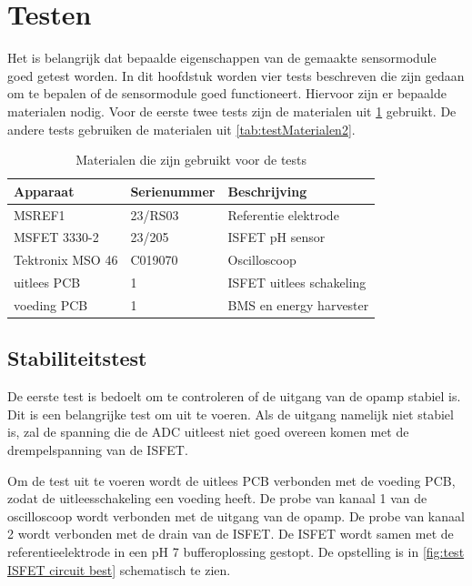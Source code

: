 \section{Testen}

Het is belangrijk dat bepaalde eigenschappen van de gemaakte sensormodule goed getest worden. In dit hoofdstuk worden vier tests beschreven die zijn gedaan om te bepalen of de sensormodule goed functioneert. Hiervoor zijn er bepaalde materialen nodig. Voor de eerste twee tests zijn de materialen uit \cref{tab:testMaterialen} gebruikt. De andere tests gebruiken de materialen uit \cref{tab:testMaterialen2}.

\begin{table}[!htbp]
    \centering
    \begin{tabular}{l|l|l}
        Apparaat         & Serienummer & Beschrijving \\
        \hline
        MSREF1           & 23/RS03     & Referentie elektrode       \\
        MSFET 3330-2     & 23/205      & ISFET pH sensor            \\
        Tektronix MSO 46 & C019070     & Oscilloscoop               \\
        uitlees PCB      & 1           & ISFET uitlees schakeling   \\
        voeding PCB      & 1           & BMS en energy harvester    \\
        \hline
    \end{tabular}
    \caption{Materialen die zijn gebruikt voor de tests}
    \label{tab:testMaterialen}
\end{table}

\subsection{Stabiliteitstest}
De eerste test is bedoelt om te controleren of de uitgang van de opamp stabiel is. Dit is een belangrijke test om uit te voeren. Als de uitgang namelijk niet stabiel is, zal de spanning die de ADC uitleest niet goed overeen komen met de drempelspanning van de ISFET.

Om de test uit te voeren wordt de uitlees PCB verbonden met de voeding PCB, zodat de uitleesschakeling een voeding heeft. De probe van kanaal 1 van de oscilloscoop wordt verbonden met de uitgang van de opamp. De probe van kanaal 2 wordt verbonden met de drain van de ISFET. De ISFET wordt samen met de referentieelektrode in een pH 7 bufferoplossing gestopt. De opstelling is in \cref{fig:test ISFET circuit best} schematisch te zien.

